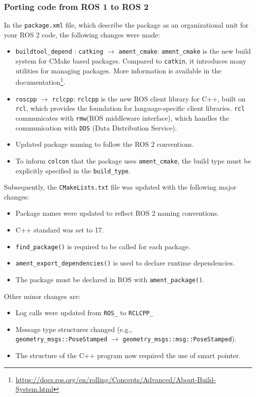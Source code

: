 \subsubsection{Porting code from ROS 1 to ROS 2}
In the \texttt{package.xml} file, which describe the package as an organizational unit for your ROS 2 code, the following changes were made:
\begin{itemize}
	\item \texttt{buildtool\_depend} : \texttt{catking} $\rightarrow$ \texttt{ament\_cmake}: \texttt{ament\_cmake} is the new build system for CMake based packages. Compared to \texttt{catkin}, it introduces many utilities for managing packages. More information is available in the documentation\footnote{\href{https://docs.ros.org/en/rolling/Concepts/Advanced/About-Build-System.html}{https://docs.ros.org/en/rolling/Concepts/Advanced/About-Build-System.html}}.
	\item \texttt{roscpp} $\rightarrow$ \texttt{rclcpp}: \texttt{rclcpp} is the new ROS client library for C++, built on \texttt{rcl}, which provides the foundation for language-specific client libraries. \texttt{rcl} communicates with \texttt{rmw}(ROS middleware interface), which handles the communication with \texttt{DDS} (Data Distribution Service).
	\item Updated package naming to follow the ROS 2 conventions.
	\item To inform \texttt{colcon} that the package uses \texttt{ament\_cmake}, the build type must be explicitly specified in the \texttt{build\_type}.
\end{itemize}
Subsequently, the \texttt{CMakeLists.txt} file was updated with the following major changes:
\begin{itemize}
	\item Package names were updated to reflect ROS 2 naming conventions.
	\item C++ standard was set to 17.
	\item \texttt{find\_package()} is required to be called for each package.
	\item \texttt{ament\_export\_dependencies()}  is used to declare runtime dependencies.
	\item The package must be declared in ROS with \texttt{ament\_package()}.
\end{itemize}
Other minor changes are:

\begin{itemize}
	\item Log calls were updated from \texttt{ROS\_} to \texttt{RCLCPP\_}
	\item Message type structures changed (e.g.,\\ \texttt{geometry\_msgs::PoseStamped} $\rightarrow$ \texttt{geometry\_msgs::msg::PoseStamped}).
	\item The structure of the C++ program now required the use of smart pointer.
\end{itemize}

